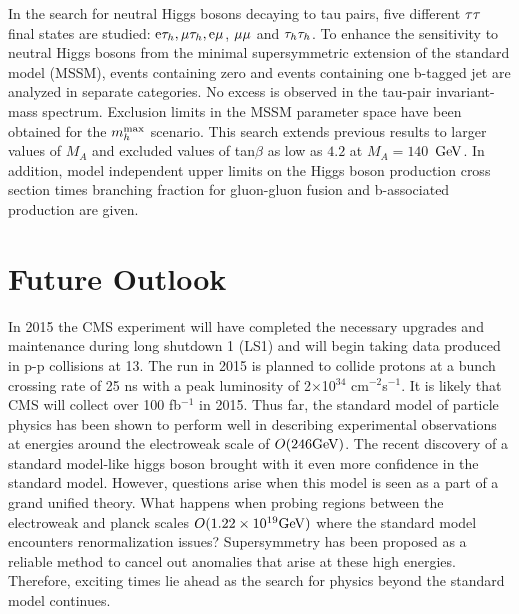 In the search for neutral Higgs bosons decaying to tau pairs, five different $\mathrm{\tau}\mathrm{\tau}$ final states are studied: 
$\mathrm{e}\mathrm{\tau}_{h}, \mathrm{\mu}\mathrm{\tau}_{h}, \mathrm{e}\mathrm{\mu}$, $\mathrm{\mu}\mathrm{\mu}$ and $\mathrm{\tau}_{h}\mathrm{\tau}_{h}$. 
To enhance the sensitivity to neutral Higgs bosons 
from the minimal supersymmetric extension of the standard model (MSSM), 
events containing zero and events containing one b-tagged jet are analyzed in separate categories.
No excess is observed in the tau-pair invariant-mass spectrum. 
Exclusion limits in the MSSM parameter space have been obtained 
for the $m_h^{\rm max}$ scenario. This search extends previous 
results to larger values of $M_A$ and excluded values of tan$\beta$ 
as low as $4.2$ at $M_A=140$~$\mathrm{GeV}$. 
In addition, model independent upper limits on the Higgs boson production cross 
section times branching fraction for gluon-gluon fusion and b-associated 
production are given.

\section{Future Outlook}
In 2015 the CMS experiment will have completed the necessary upgrades and 
 maintenance during long shutdown 1 (LS1) and 
will begin taking data produced in p-p collisions at 13\TeV. The run 
in 2015 is planned to collide protons at a bunch crossing rate of 25 ns 
with a peak luminosity of 2$\times$10$^{34}$ cm$^{-2}$s$^{-1}$. 
 It is likely that CMS will collect over 100 fb$^{-1}$ in 2015. 
 Thus far, the standard model of particle physics has been
 shown to perform well in describing experimental observations at energies around
 the electroweak scale of $O(246 \mathrm{GeV})$.
 The recent discovery of a standard model-like higgs boson brought with it
 even more confidence in the standard model. However, questions arise when this model is seen as 
 a part of a grand unified theory. What happens when probing
 regions between the electroweak and planck scales $O(1.22 \times10^{19} \mathrm{GeV})$ where
 the standard model encounters renormalization issues? 
 Supersymmetry has been proposed as a reliable method to 
 cancel out anomalies that arise at these high energies. 
 Therefore, exciting times lie ahead as the search for physics beyond the standard model 
 continues.  